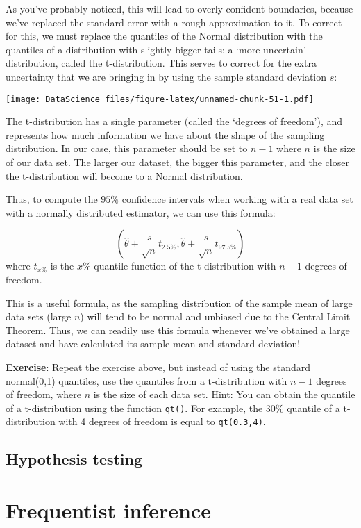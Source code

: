 \documentclass[
]{book}
\begin{document}
As you've probably noticed, this will lead to overly confident boundaries, because we've replaced the standard error with a rough approximation to it. To correct for this, we must replace the quantiles of the Normal distribution with the quantiles of a distribution with slightly bigger tails: a `more uncertain' distribution, called the t-distribution. This serves to correct for the extra uncertainty that we are bringing in by using the sample standard deviation \(s\):

\texttt{[image: DataScience\_files/figure-latex/unnamed-chunk-51-1.pdf]}

The t-distribution has a single parameter (called the `degrees of freedom'), and represents how much information we have about the shape of the sampling distribution. In our case, this parameter should be set to \(n-1\) where \(n\) is the size of our data set. The larger our dataset, the bigger this parameter, and the closer the t-distribution will become to a Normal distribution.

Thus, to compute the \(95\%\) confidence intervals when working with a real data set with a normally distributed estimator, we can use this formula:

\[(\hat{\theta} + \frac{s}{\sqrt{n}}t_{2.5\%}, \hat{\theta} + \frac{s}{\sqrt{n}}t_{97.5\%})\]
where \(t_{x\%}\) is the \(x\%\) quantile function of the t-distribution with \(n-1\) degrees of freedom.

This is a useful formula, as the sampling distribution of the sample mean of large data sets (large \(n\)) will tend to be normal and unbiased due to the Central Limit Theorem. Thus, we can readily use this formula whenever we've obtained a large dataset and have calculated its sample mean and standard deviation!

\textbf{Exercise}: Repeat the exercise above, but instead of using the standard normal(0,1) quantiles, use the quantiles from a t-distribution with \(n-1\) degrees of freedom, where \(n\) is the size of each data set. Hint: You can obtain the quantile of a t-distribution using the function \texttt{qt()}. For example, the \(30\%\) quantile of a t-distribution with 4 degrees of freedom is equal to \texttt{qt(0.3,4)}.

\hypertarget{hypothesis-testing}{%
\section{Hypothesis testing}\label{hypothesis-testing}}

\hypertarget{frequentist-inference}{%
\chapter{Frequentist inference}\label{frequentist-inference}}
\end{document}
